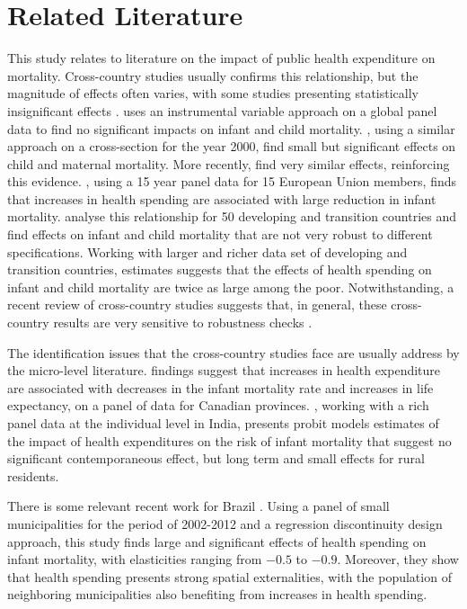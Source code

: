 \section{Related Literature}\label{sec:inst}

This study relates to literature on the impact of public health expenditure on mortality. Cross-country studies usually confirms this relationship, but the magnitude of effects often varies, with some studies presenting statistically insignificant effects . \cite{filmer1999} uses an instrumental variable approach on a global panel data to find no significant impacts on infant and child mortality. \cite{bokhari2007}, using a similar approach on a cross-section for the year 2000, find small but significant effects on child and maternal mortality. More recently, \cite{moreno2015} find very similar effects, reinforcing this evidence. \cite{nixon2006}, using a 15 year panel data for 15 European Union members, finds that increases in health spending are associated with large reduction in infant mortality. \cite{gupta2002effectiveness} analyse this relationship for 50 developing and transition countries and find effects on infant and child mortality that are not very robust to different specifications. Working with larger and richer data set of developing and transition countries, \cite{Gupta2003} estimates suggests that the  effects of health spending on infant and child mortality are twice as large among the poor. Notwithstanding, a recent review of cross-country studies suggests that, in general, these cross-country results are very sensitive to robustness checks \citep{Nakamura2020}. 

The identification issues that the cross-country studies face are usually address by the micro-level literature. \cite{cremieux1999} findings suggest that increases in health expenditure are associated with decreases in the infant mortality rate and increases in life expectancy, on a panel of data for Canadian provinces. \cite{sonia2007}, working with a rich panel data at the individual level in India, presents probit models estimates of the impact of health expenditures on the risk of infant mortality that suggest no significant contemporaneous effect, but long term and small effects for rural residents. 

There is some relevant recent work for Brazil \citep{castro2021effects}. Using a panel of small municipalities for the period of 2002-2012 and a regression discontinuity design approach, this study finds large and significant effects of health spending on infant mortality, with elasticities ranging from $-0.5$ to $-0.9$. Moreover, they show that health spending presents strong spatial externalities, with the population of neighboring municipalities also benefiting from increases in health spending.

